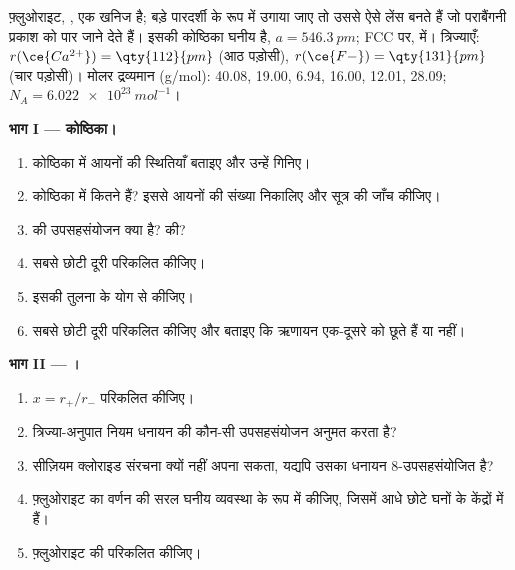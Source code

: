\begin{problem}
\label{pb:b1:crystals-ionic-covalent:1}
फ़्लुओराइट, , एक खनिज है; बड़े पारदर्शी  के रूप में उगाया जाए तो उससे
ऐसे लेंस बनते हैं जो पराबैंगनी प्रकाश को पार जाने देते हैं। इसकी कोष्ठिका घनीय है, $a =
\qty{546.3}{pm}$;  FCC  पर, 
 में। त्रिज्याएँ: $r(\ce{Ca^{2+}}) = \qty{112}{pm}$ (आठ
पड़ोसी), $r(\ce{F-}) = \qty{131}{pm}$ (चार पड़ोसी)। मोलर द्रव्यमान
(g/mol):  40.08,  19.00,  6.94,  16.00, 
12.01,  28.09; $N_A = \qty{6.022e23}{mol^{-1}}$।

\medskip
\noindent\textbf{भाग I --- कोष्ठिका।}
\begin{enumerate}
  \item कोष्ठिका में  आयनों की स्थितियाँ बताइए और उन्हें
        गिनिए।
  \item कोष्ठिका में कितने  हैं? इससे
         आयनों की संख्या निकालिए और सूत्र की जाँच कीजिए।
  \item {} की उपसहसंयोजन क्या है?  की?
  \item सबसे छोटी  दूरी परिकलित कीजिए।
  \item इसकी तुलना  के योग से कीजिए।
  \item सबसे छोटी  दूरी परिकलित कीजिए और बताइए कि
        ऋणायन एक-दूसरे को छूते हैं या नहीं।
\end{enumerate}

\medskip
\noindent\textbf{भाग II --- ।}
\begin{enumerate}[resume]
  \item $x = r_+/r_-$ परिकलित कीजिए।
  \item त्रिज्या-अनुपात नियम धनायन की कौन-सी उपसहसंयोजन अनुमत करता है?
  \item {} सीज़ियम क्लोराइड संरचना क्यों नहीं अपना सकता, यद्यपि
        उसका धनायन 8-उपसहसंयोजित है?
  \item फ़्लुओराइट का वर्णन  की सरल घनीय व्यवस्था के रूप में कीजिए, जिसमें
         आधे छोटे घनों के केंद्रों में हैं।
  \item फ़्लुओराइट की  परिकलित कीजिए।
\end{enumerate}


\end{problem}
